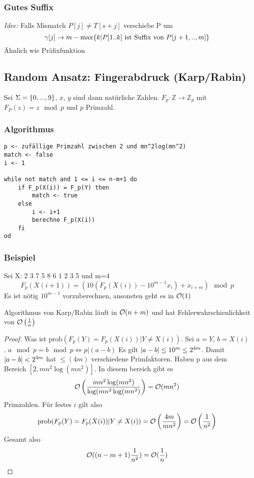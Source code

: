             \subsubsection{Gutes Suffix}
                \emph{Idee:} Falls Mismatch $P[j] \neq T[s+j]$ verschiebe P um 
                $$
                    \gamma[j] \rightarrow m - \max \{k | P[1..k] \text{ ist Suffix von }P[j+1,..,m]\}
                $$
                Ähnlich wie Präfixfunktion
                
        \subsection{Random Ansatz: Fingerabdruck (Karp/Rabin)}
            Sei $\Sigma = \{0,...,9\}$, $x$, $y$ sind dann natürliche Zahlen. $F_p: \mathbb{Z} \rightarrow \mathbb{Z}_p$ mit $F_P(z) = z \mod p$ und $p$ Primzahl.
            
            \subsubsection{Algorithmus}
\begin{verbatim}
p <- zufällige Primzahl zwischen 2 und mn^2log(mn^2)
match <- false
i <- 1

while not match and 1 <= i <= n-m+1 do
    if F_p(X(i)) = F_p(Y) then
        match <- true
    else
        i <- i+1
        berechne F_p(X(i))
    fi
od
\end{verbatim}
        \subsubsection{Beispiel}
        Sei X: 2 3 7 5 8 6 1 2 3 5 und m=4
        $$
            F_p(X(i+1)) = (10(F_p(X(i)) - 10^{m-1}x_i)+x_{i+m}) \mod p
        $$
        Es ist nötig $10^{m-1}$ vorzuberechnen, ansonsten geht es in $\mathcal{O}(1)$
        
        \begin{satz}
            Algorithmus von Karp/Rabin läuft in $\mathcal{O}(n+m)$ und hat Fehlerwahrschienlichkeit von $\mathcal{O}\left(\frac{1}{n}\right)$
        \end{satz}
        
        \begin{proof}
            Was ist $\text{prob}(F_p(Y)=F_p(X(i)) | Y \neq X(i))$. Sei $a = Y$, $b = X(i)$. $a \mod p = b \mod p \Leftrightarrow p | (a-b)$ Es gilt $\lvert a-b\rvert \leq 10^m \leq 2^{4m}$. Damit $\lvert a-b\rvert < 2^{4m}$ hat $\leq(4m)$ verschiedene Primfaktoren. Haben p aus dem Bereich $[2, mn^2\log(mn^2)]$. In diesem bereich gibt es
            $$
                \mathcal{O}\left( \frac{mn^2\log(mn^2)}{\log(mn^2\log(mn^2)}\right) = \mathcal{O}(mn^2)
            $$
            Primzahlen. Für festes $i$ gilt also
            $$
                \text{prob}(F_p(Y) = F_p(X(i)) | Y \neq X(i)) = \mathcal{O} \left(\frac{4m}{mn^2}\right) = \mathcal{O} \left(\frac{1}{n^2} \right)
            $$
            Gesamt also
            $$
                \mathcal{O}((n-m+1) \frac{1}{n^2}) = \mathcal{O}(\frac{1}{n})
            $$
        \end{proof}
        
